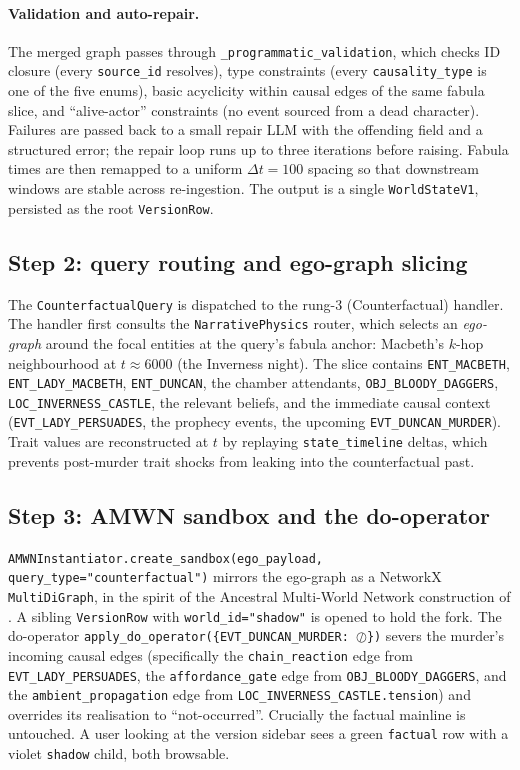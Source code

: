 \documentclass[11pt]{article}
\begin{document}
\paragraph{Validation and auto-repair.} The merged graph passes
through \texttt{\_programmatic\_validation}, which checks ID
closure (every \texttt{source\_id} resolves), type constraints
(every \texttt{causality\_type} is one of the five enums), basic
acyclicity within causal edges of the same fabula slice, and
``alive-actor'' constraints (no event sourced from a dead
character). Failures are passed back to a small repair LLM with
the offending field and a structured error; the repair loop runs
up to three iterations before raising. Fabula times are then
remapped to a uniform $\Delta t = 100$ spacing so that downstream
windows are stable across re-ingestion. The output is a single
\texttt{WorldStateV1}, persisted as the root
\texttt{VersionRow}.

\subsection{Step 2: query routing and ego-graph slicing}
\label{app:wk-route}

The \texttt{CounterfactualQuery} is dispatched to the rung-3
(Counterfactual)
handler. The handler first consults the \texttt{NarrativePhysics}
router, which selects an \emph{ego-graph} around the focal
entities at the query's fabula anchor: Macbeth's $k$-hop
neighbourhood at $t \approx 6000$ (the Inverness night). The
slice contains \texttt{ENT\_MACBETH}, \texttt{ENT\_LADY\_MACBETH},
\texttt{ENT\_DUNCAN}, the chamber attendants,
\texttt{OBJ\_BLOODY\_DAGGERS}, \texttt{LOC\_INVERNESS\_CASTLE},
the relevant beliefs, and the immediate causal context
(\texttt{EVT\_LADY\_PERSUADES}, the prophecy events, the
upcoming \texttt{EVT\_DUNCAN\_MURDER}). Trait values are
reconstructed at $t$ by replaying \texttt{state\_timeline}
deltas, which prevents post-murder trait shocks from leaking
into the counterfactual past.

\subsection{Step 3: AMWN sandbox and the do-operator}
\label{app:wk-amwn}

\texttt{AMWNInstantiator.create\_sandbox(ego\_payload, query\_type="counterfactual")}
mirrors the ego-graph as a NetworkX \texttt{MultiDiGraph}, in
the spirit of the Ancestral Multi-World Network construction of
\citet{correa2025amwn}. A sibling \texttt{VersionRow} with
\texttt{world\_id="shadow"} is opened to hold the fork. The
do-operator \texttt{apply\_do\_operator(\{EVT\_DUNCAN\_MURDER:
$\oslash$\})} severs the murder's incoming causal edges
(specifically the \texttt{chain\_reaction} edge from
\texttt{EVT\_LADY\_PERSUADES}, the \texttt{affordance\_gate} edge
from \texttt{OBJ\_BLOODY\_DAGGERS}, and the
\texttt{ambient\_propagation} edge from
\texttt{LOC\_INVERNESS\_CASTLE.tension}) and overrides its
realisation to ``not-occurred''. Crucially the factual mainline
is untouched. A user looking at the version sidebar sees a green
\texttt{factual} row with a violet \texttt{shadow} child, both
browsable.
\end{document}

